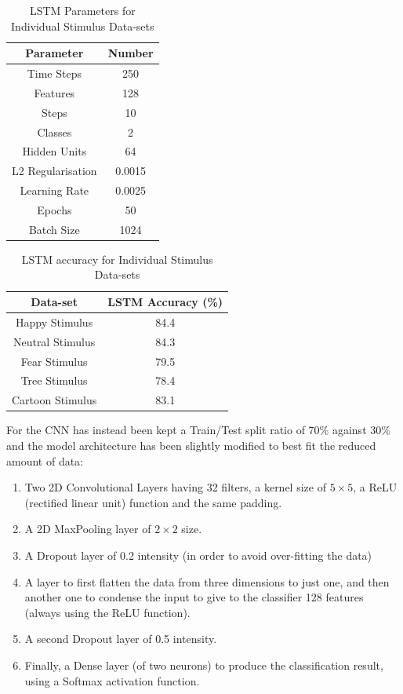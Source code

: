 \begin{appendices}
{
\begin{table}[h!]
\centering
\begin{tabular}{|c|c|}
\hline
Parameter &Number \\
\hline
Time Steps & 250  \\
Features & 128  \\
Steps & 10  \\
Classes & 2 \\
Hidden Units & 64 \\
L2 Regularisation & 0.0015 \\
Learning Rate & 0.0025 \\
Epochs & 50 \\
Batch Size & 1024 \\
\hline
\end{tabular}
\caption{LSTM Parameters for Individual Stimulus Data-sets}
\label{table:1}
\end{table}
}

{
\begin{table}[h!]
\centering
\begin{tabular}{|c|c|}
\hline
Data-set &LSTM Accuracy (\%) \\
\hline
Happy Stimulus & 84.4  \\
Neutral Stimulus & 84.3  \\
Fear Stimulus & 79.5  \\
Tree Stimulus & 78.4 \\
Cartoon Stimulus & 83.1 \\
\hline
\end{tabular}
\caption{LSTM accuracy for Individual Stimulus Data-sets}
\label{table:1}
\end{table}
}

For the CNN has instead been kept a Train/Test split ratio of 70\% against 30\% and the model architecture has been slightly modified to best fit the reduced amount of data:

\begin{enumerate}
\itemsep0em
\item Two 2D Convolutional Layers having 32 filters, a kernel size of $5\times5$, a ReLU (rectified linear unit) function and the same padding. 
\item A 2D MaxPooling layer of $2\times2$ size.
\item A Dropout layer of 0.2 intensity (in order to avoid over-fitting the data)
\item A layer to first flatten the data from three dimensions to just one, and then another one to condense the input to give to the classifier 128 features (always using the ReLU function).
\item A second Dropout layer of 0.5 intensity.
\item Finally, a Dense layer (of two neurons) to produce the classification result, using a Softmax activation function.
\end{enumerate}


\end{appendices}
